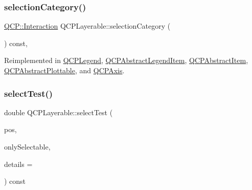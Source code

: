 \mbox{\label{class_q_c_p_layerable_a908c9edda761886f33893be326dab77d}} 
\subsubsection{\texorpdfstring{selectionCategory()}{selectionCategory()}}
{\footnotesize\ttfamily \mbox{\hyperlink{namespace_q_c_p_a2ad6bb6281c7c2d593d4277b44c2b037}{Q\+C\+P\+::\+Interaction}} Q\+C\+P\+Layerable\+::selection\+Category (\begin{DoxyParamCaption}{ }\end{DoxyParamCaption}) const\hspace{0.3cm}{\ttfamily [protected]}, {\ttfamily [virtual]}}



Reimplemented in \mbox{\hyperlink{class_q_c_p_legend_a1a2075e462984f9ff51d9c75bda3581b}{Q\+C\+P\+Legend}}, \mbox{\hyperlink{class_q_c_p_abstract_legend_item_af8eb0fda0e11b0a23e1051b0102c8c6a}{Q\+C\+P\+Abstract\+Legend\+Item}}, \mbox{\hyperlink{class_q_c_p_abstract_item_aceb5f99c361cf023c7cbe7339ea29571}{Q\+C\+P\+Abstract\+Item}}, \mbox{\hyperlink{class_q_c_p_abstract_plottable_af80ad8531642e786b6f4fad551c203c4}{Q\+C\+P\+Abstract\+Plottable}}, and \mbox{\hyperlink{class_q_c_p_axis_ab751e3e96495716a2f6742ca7d7b3d49}{Q\+C\+P\+Axis}}.

\mbox{\label{class_q_c_p_layerable_a04db8351fefd44cfdb77958e75c6288e}} 
\subsubsection{\texorpdfstring{selectTest()}{selectTest()}}
{\footnotesize\ttfamily double Q\+C\+P\+Layerable\+::select\+Test (\begin{DoxyParamCaption}\item[{const Q\+PointF \&}]{pos,  }\item[{bool}]{only\+Selectable,  }\item[{Q\+Variant $\ast$}]{details = {} }\end{DoxyParamCaption}) const\hspace{0.3cm}{\ttfamily [virtual]}}

